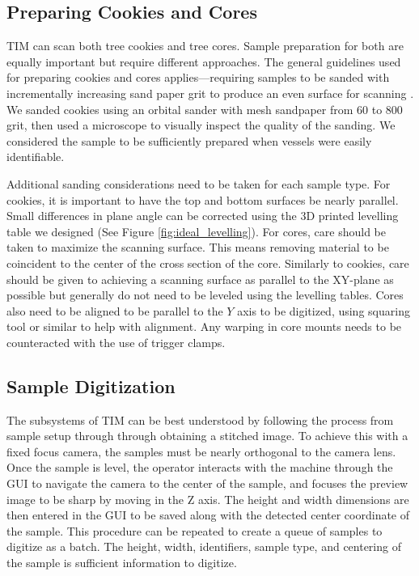 \documentclass[a4paper,12pt]{article}
\begin{document}
\subsection{Preparing Cookies and Cores}
TIM can scan both tree cookies and tree cores. Sample preparation for both are equally important but require different approaches.
The general guidelines used for preparing cookies and cores applies---requiring samples to be sanded with incrementally increasing sand paper grit to produce an even surface for scanning \citep{speer_fundamentals_2010}. We sanded cookies using an orbital sander with mesh sandpaper from 60 to 800 grit, then used a microscope to visually inspect the quality of the sanding. We considered the sample to be sufficiently prepared when vessels were easily identifiable.

Additional sanding considerations need to be taken for each sample type. 
For cookies, it is important to have the top and bottom surfaces be nearly parallel. Small differences in plane angle can be corrected using the 3D printed levelling table we designed (See Figure \ref{fig:ideal_levelling}). 
For cores, care should be taken to maximize the scanning surface. This means removing material to be coincident to the center of the cross section of the core. 
Similarly to cookies, care should be given to achieving a scanning surface as parallel to the XY-plane as possible but generally do not need to be leveled using the levelling tables.
Cores also need to be aligned to be parallel to the $Y$ axis to be digitized, using squaring tool or similar to help with alignment. Any warping in core mounts needs to be counteracted with the use of trigger clamps. 

\subsection{Sample Digitization} %

The subsystems of TIM can be best understood by following the process from sample setup through through obtaining a stitched image. 
To achieve this with a fixed focus camera, the samples must be nearly orthogonal to the camera lens. 
Once the sample is level, the operator interacts with the machine through the GUI to navigate the camera to the center of the sample, and focuses the preview image to be sharp by moving in the Z axis. The height and width dimensions are then entered in the GUI
to be saved along with the detected center coordinate of the sample. This procedure can be repeated to create a queue of samples to digitize as a batch.
The height, width, identifiers, sample type, and centering of the sample is sufficient information to digitize.
\end{document}
